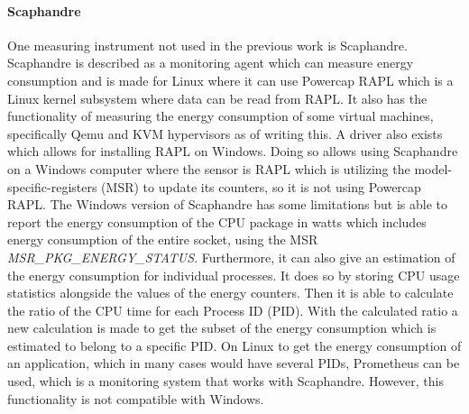 \paragraph{Scaphandre}
One measuring instrument not used in the previous work is Scaphandre\cite{scaphandre}. Scaphandre is described as a monitoring agent which can measure energy consumption and is made for Linux where it can use Powercap RAPL which is a Linux kernel subsystem where data can be read from RAPL. It also has the functionality of measuring the energy consumption of some virtual machines, specifically Qemu and KVM hypervisors as of writing this. A driver also exists which allows for installing RAPL on Windows.\cite{RAPL_Windows} Doing so allows using Scaphandre on a Windows computer where the sensor is RAPL which is utilizing the model-specific-registers (MSR) to update its counters, so it is not using Powercap RAPL. The Windows version of Scaphandre has some limitations but is able to report the energy consumption of the CPU package in watts which includes energy consumption of the entire socket, using the MSR \textit{MSR\_PKG\_ENERGY\_STATUS}. Furthermore, it can also give an estimation of the energy consumption for individual processes. It does so by storing CPU usage statistics alongside the values of the energy counters. Then it is able to calculate the ratio of the CPU time for each Process ID (PID). With the calculated ratio a new calculation is made to get the subset of the energy consumption which is estimated to belong to a specific PID. On Linux to get the energy consumption of an application, which in many cases would have several PIDs, Prometheus can be used, which is a monitoring system that works with Scaphandre. However, this functionality is not compatible with Windows.